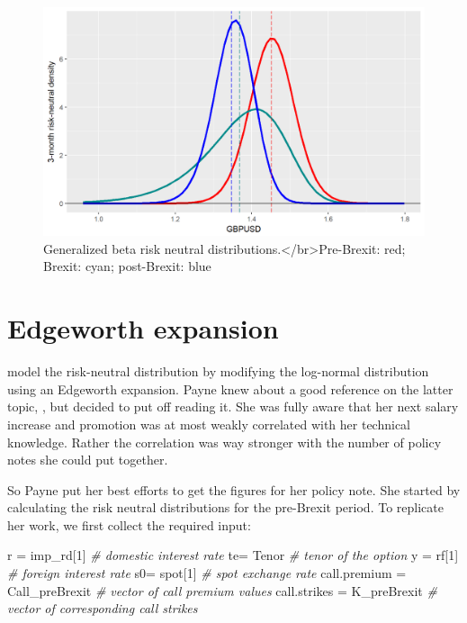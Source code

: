 \documentclass[]{book}
\newenvironment{Shaded}{\begin{snugshade}}{\end{snugshade}}
\newcommand{\DecValTok}[1]{\textcolor[rgb]{0.00,0.00,0.81}{#1}}
\newcommand{\StringTok}[1]{\textcolor[rgb]{0.31,0.60,0.02}{#1}}
\newcommand{\CommentTok}[1]{\textcolor[rgb]{0.56,0.35,0.01}{\textit{#1}}}
\newcommand{\NormalTok}[1]{#1}
\theoremstyle{definition}
\theoremstyle{definition}
\theoremstyle{definition}
\theoremstyle{remark}
\begin{document}
\begin{figure}
\includegraphics[width=1\linewidth]{images/unnamed-chunk-53-1} \caption{Generalized beta risk neutral distributions.</br>Pre-Brexit: red; Brexit: cyan; post-Brexit: blue}\label{fig:unnamed-chunk-53}
\end{figure}

\section{Edgeworth expansion}\label{edgeworth-expansion}

\citet{Jarrow-Rudd1982} model the risk-neutral distribution by modifying
the log-normal distribution using an Edgeworth expansion. Payne knew
about a good reference on the latter topic, \citet{Hall1992}, but
decided to put off reading it. She was fully aware that her next salary
increase and promotion was at most weakly correlated with her technical
knowledge. Rather the correlation was way stronger with the number of
policy notes she could put together.

So Payne put her best efforts to get the figures for her policy note.
She started by calculating the risk neutral distributions for the
pre-Brexit period. To replicate her work, we first collect the required
input:

\begin{Shaded}
\begin{Highlighting}[]
\NormalTok{r =}\StringTok{ }\NormalTok{imp_rd[}\DecValTok{1}\NormalTok{]                      }\CommentTok{# domestic interest rate}
\NormalTok{te=}\StringTok{ }\NormalTok{Tenor                          }\CommentTok{# tenor of the option}
\NormalTok{y =}\StringTok{ }\NormalTok{rf[}\DecValTok{1}\NormalTok{]                          }\CommentTok{# foreign interest rate}
\NormalTok{s0=}\StringTok{ }\NormalTok{spot[}\DecValTok{1}\NormalTok{]                        }\CommentTok{# spot exchange rate}
\NormalTok{call.premium =}\StringTok{ }\NormalTok{Call_preBrexit      }\CommentTok{# vector of call premium values}
\NormalTok{call.strikes =}\StringTok{ }\NormalTok{K_preBrexit         }\CommentTok{# vector of corresponding call strikes}
\end{Highlighting}
\end{Shaded}
\end{document}
